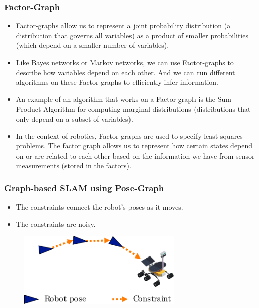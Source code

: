    \begin{frame}
    \frametitle{Factor-Graph}
    
    \begin{itemize}
    \item Factor-graphs allow us to represent a joint probability distribution (a distribution that governs all variables) as a product of smaller probabilities (which depend on a smaller number of variables).
    \item Like Bayes networks or Markov networks, we can use Factor-graphs to describe how variables depend on each other. And we can run different algorithms on these Factor-graphs to efficiently infer information.
    \item An example of an algorithm that works on a Factor-graph is the Sum-Product Algorithm for computing marginal distributions (distributions that only depend on a subset of variables).
    \item In the context of robotics, Factor-graphs are used to specify least squares problems. The factor graph allows us to represent how certain states depend on or are related to each other based on the information we have from sensor measurements (stored in the factors).
    \end{itemize}
    
    
    \end{frame}
    
    \begin{frame}
    \frametitle{Graph-based SLAM using Pose-Graph}
    
    \begin{itemize}
    \item The constraints connect the robot's poses as it moves.
    \item The constraints are noisy.
    \end{itemize}
    
    \begin{figure}[!h]
    \includegraphics[width=0.7\textwidth]{images/pose_graph_example.pdf}
    \end{figure}
    
\end{frame}

